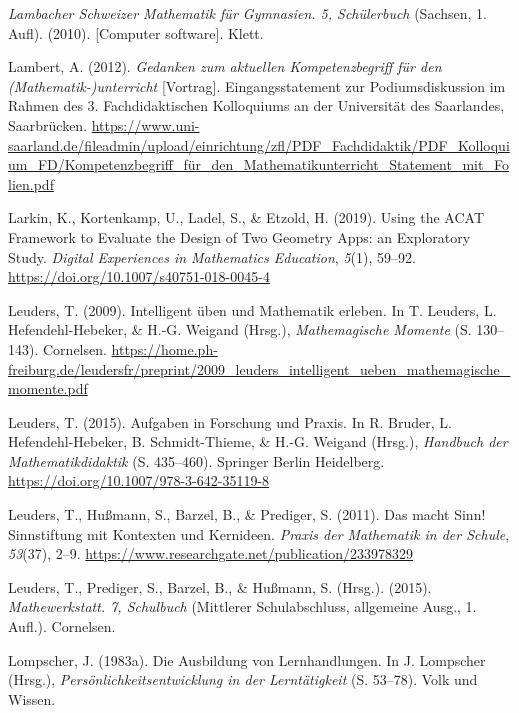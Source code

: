 \documentclass[
]{scrbook}
\newlength{\cslhangindent}
\newlength{\cslentryspacingunit} %
\newenvironment{CSLReferences}[2] %
 {%
  \setlength{\parindent}{0pt}
  \ifodd #1
  \let\oldpar\par
  \def\par{\hangindent=\cslhangindent\oldpar}
  \fi
  \setlength{\parskip}{#2\cslentryspacingunit}
 }%
 {}
\theoremstyle{definition}
\theoremstyle{definition}
\theoremstyle{definition}
\theoremstyle{definition}
\theoremstyle{remark}
\begin{document}
\begin{CSLReferences}{1}{0}
\leavevmode{}%
\emph{Lambacher {Schweizer} {Mathematik} für {Gymnasien}. 5, {Schülerbuch}} (Sachsen, 1. Aufl). (2010). {[}Computer software{]}. Klett.

\leavevmode{}%
Lambert, A. (2012). \emph{Gedanken zum aktuellen {Kompetenzbegriff} für den ({Mathematik}-)unterricht} {[}Vortrag{]}. Eingangsstatement zur Podiumsdiskussion im Rahmen des 3. Fachdidaktischen Kolloquiums an der Universität des Saarlandes, Saarbrücken. \url{https://www.uni-saarland.de/fileadmin/upload/einrichtung/zfl/PDF_Fachdidaktik/PDF_Kolloquium_FD/Kompetenzbegriff_für_den_Mathematikunterricht_Statement_mit_Folien.pdf}

\leavevmode{}%
Larkin, K., Kortenkamp, U., Ladel, S., \& Etzold, H. (2019). Using the {ACAT} {Framework} to {Evaluate} the {Design} of {Two} {Geometry} {Apps}: an {Exploratory} {Study}. \emph{Digital Experiences in Mathematics Education}, \emph{5}(1), 59--92. \url{https://doi.org/10.1007/s40751-018-0045-4}

\leavevmode{}%
Leuders, T. (2009). Intelligent üben und {Mathematik} erleben. In T. Leuders, L. Hefendehl-Hebeker, \& H.-G. Weigand (Hrsg.), \emph{Mathemagische {Momente}} (S. 130--143). Cornelsen. \url{https://home.ph-freiburg.de/leudersfr/preprint/2009_leuders_intelligent_ueben_mathemagische_momente.pdf}

\leavevmode{}%
Leuders, T. (2015). Aufgaben in {Forschung} und {Praxis}. In R. Bruder, L. Hefendehl-Hebeker, B. Schmidt-Thieme, \& H.-G. Weigand (Hrsg.), \emph{Handbuch der {Mathematikdidaktik}} (S. 435--460). Springer Berlin Heidelberg. \url{https://doi.org/10.1007/978-3-642-35119-8}

\leavevmode{}%
Leuders, T., Hußmann, S., Barzel, B., \& Prediger, S. (2011). Das macht {Sinn}! {Sinnstiftung} mit {Kontexten} und {Kernideen}. \emph{Praxis der Mathematik in der Schule}, \emph{53}(37), 2--9. \url{https://www.researchgate.net/publication/233978329}

\leavevmode{}%
Leuders, T., Prediger, S., Barzel, B., \& Hußmann, S. (Hrsg.). (2015). \emph{Mathewerkstatt. 7, {Schulbuch}} (Mittlerer Schulabschluss, allgemeine Ausg., 1. Aufl.). Cornelsen.

\leavevmode{}%
Lompscher, J. (1983a). Die {Ausbildung} von {Lernhandlungen}. In J. Lompscher (Hrsg.), \emph{Persönlichkeitsentwicklung in der {Lerntätigkeit}} (S. 53--78). Volk und Wissen.


\end{CSLReferences}
\end{document}
